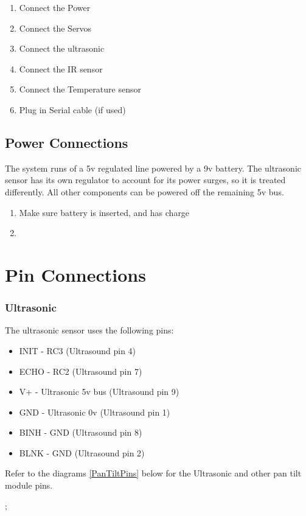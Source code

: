 \documentclass[]{report}
\begin{document}
\begin{enumerate}
	\item Connect the Power
	\item Connect the Servos
	\item Connect the ultrasonic
	\item Connect the IR sensor
	\item Connect the Temperature sensor
	\item Plug in Serial cable (if used)
\end{enumerate}

\section{Power Connections}
The system runs of a 5v regulated line powered by a 9v battery. The ultrasonic sensor has its own regulator to account for its power surges, so it is treated differently. All other components can be powered off the remaining 5v bus.

\begin{enumerate}
	\item Make sure battery is inserted, and has charge
	\item 
\end{enumerate}

\chapter{Pin Connections}
\subsection{Ultrasonic}
The ultrasonic sensor uses the following pins: 
\begin{itemize}
	\item INIT - RC3 (Ultrasound pin 4)
	\item ECHO - RC2 (Ultrasound pin 7)
	\item V+ - Ultrasonic 5v bus  (Ultrasound pin 9)
	\item GND - Ultrasonic 0v (Ultrasound pin 1)
	\item BINH - GND (Ultrasound pin 8)
	\item BLNK - GND (Ultrasound pin 2)
\end{itemize}
Refer to the diagrams \ref{PanTiltPins} below for the Ultrasonic and other pan tilt module pins.

;
\label{PanTiltPins}
\end{document}
